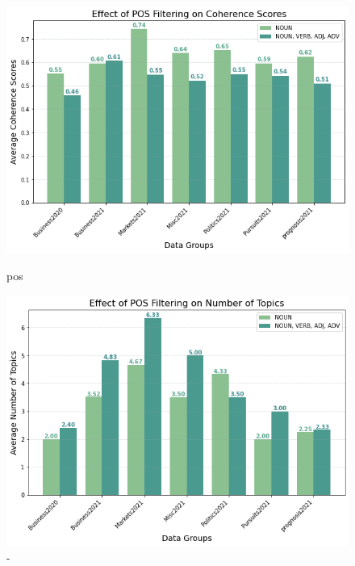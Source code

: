 \begin{figure}
  \centering
    \begin{minipage}[t]{.49\linewidth}
      \centering
      \includegraphics[width=\linewidth]{images/eval/pos_coherence.png}
      \caption{pos}
      \label{fig:pos_topic}
    \end{minipage}
    \begin{minipage}[t]{.49\linewidth}
      \centering
      \includegraphics[width=\linewidth]{images/eval/topics_pos.png}
      \caption{-}
       \label{fig:topics_pos}
    \end{minipage}
  \end{figure}


